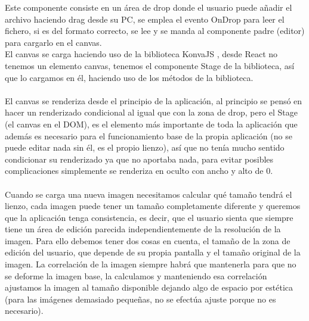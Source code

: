 Este componente consiste en un área de drop donde el usuario puede añadir el archivo 
haciendo drag desde su PC, se emplea el evento OnDrop para leer el fichero, si es
del formato correcto, se lee y se manda al componente padre (editor) para cargarlo en 
el canvas.
\\
El canvas se carga haciendo uso de la biblioteca KonvaJS \cite{KonvaJS}, desde React 
no tenemos un elemento canvas, tenemos el componente Stage de la biblioteca, así que 
lo cargamos en él, haciendo uso de los métodos de la biblioteca.
\\\\
El canvas se renderiza desde el principio de la aplicación, al principio se pensó 
en hacer un renderizado condicional al igual que con la zona de drop, pero el Stage
(el canvas en el DOM), es el elemento más importante de toda la aplicación
que además es necesario para el funcionamiento base de la propia aplicación 
(no se puede editar nada sin él, es el propio lienzo), así que no tenía mucho sentido
condicionar su renderizado ya que no aportaba nada,
para evitar posibles complicaciones simplemente se renderiza en oculto con ancho y alto
de 0.
\\\\
Cuando se carga una nueva imagen necesitamos calcular qué tamaño tendrá el lienzo, 
cada imagen puede tener un tamaño completamente diferente y queremos que la aplicación
tenga consistencia, es decir, que el usuario sienta que siempre tiene un área de edición
parecida independientemente de la resolución de la imagen.
Para ello debemos tener dos cosas en cuenta, el tamaño de la zona de edición del usuario,
que depende de su propia pantalla y el tamaño original de la imagen.
La correlación de la imagen siempre habrá que mantenerla para que no se deforme la 
imagen base, la calculamos y manteniendo esa correlación ajustamos la imagen al tamaño
disponible dejando algo de espacio por estética (para las imágenes demasiado pequeñas, 
no se efectúa ajuste porque no es necesario).

